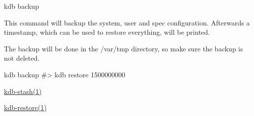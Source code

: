 {\ttfamily kdb backup}

This command will backup the {\ttfamily system}, {\ttfamily user} and {\ttfamily spec} configuration. Afterwards a timestamp, which can be used to restore everything, will be printed.

The backup will be done in the {\ttfamily /var/tmp} directory, so make sure the backup is not deleted.


\begin{DoxyCode}
kdb backup
#> kdb restore 1500000000
\end{DoxyCode}



\begin{DoxyItemize}
\item \hyperlink{doc_help_kdb-stash_md}{kdb-\/stash(1)}
\item \hyperlink{doc_help_kdb-restore_md}{kdb-\/restore(1)} 
\end{DoxyItemize}